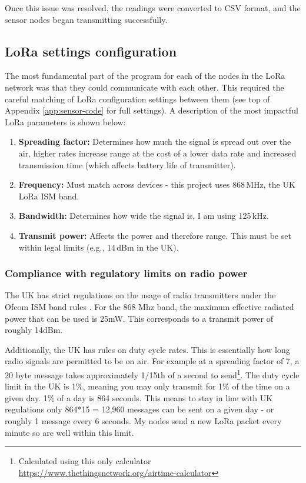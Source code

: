 Once this issue was resolved, the readings were converted to CSV format, and the
sensor nodes began transmitting successfully.

\subsection{LoRa settings configuration}

The most fundamental part of the program for each of the nodes in the LoRa
network was that they could communicate with each other. This required the
careful matching of LoRa configuration settings between them (see top of
Appendix \ref{app:sensor-code} for full settings). A description of the most
impactful LoRa parameters is shown below:

\begin{enumerate}
      \item \textbf{Spreading factor:} Determines how much the signal is spread
            out over the air, higher rates increase range at the cost of a lower
            data rate and increased transmission time (which affects battery
            life of transmitter).
      \item \textbf{Frequency:} Must match across devices - this project uses
            868\,MHz, the UK LoRa ISM band.
      \item \textbf{Bandwidth:} Determines how wide the signal is, I am using
            125\,kHz.
      \item \textbf{Transmit power:} Affects the power and therefore range. This
            must be set within legal limits (e.g., 14\,dBm in the UK).
\end{enumerate}

\subsubsection{Compliance with regulatory limits on radio
      power}\label{sec:lora-limit}

The UK has strict regulations on the usage of radio transmitters under the Ofcom
ISM band rules \cite{OfcomIR2030-2023}. For the 868 Mhz band, the maximum
effective radiated power that can be used is 25mW. This corresponds to a
transmit power of roughly 14dBm.

Additionally, the UK has rules on duty cycle rates. This is essentially how long
radio signals are permitted to be on air. For example at a spreading factor of
7, a 20 byte message takes approximately 1/15th of a second to
send\footnote{Calculated using this only calculator
\url{https://www.thethingsnetwork.org/airtime-calculator}}. The duty cycle limit
in the UK is 1\%, meaning you may only transmit for 1\% of the time on a given
day. 1\% of a day is 864 seconds. This means to stay in line with UK regulations
only 864*15 = 12,960 messages can be sent on a given day - or roughly 1 message
every 6 seconds. My nodes send a new LoRa packet every minute so are well within
this limit.

